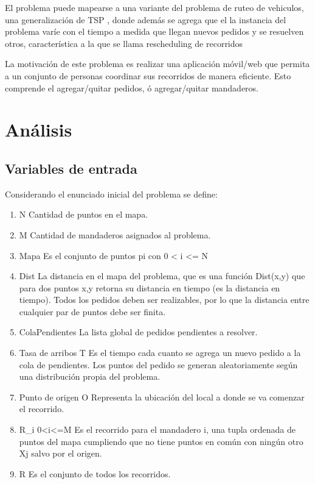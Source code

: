 \documentclass[9pt,conference]{IEEEtran}
\begin{document}
	El problema puede mapearse a una variante del problema de ruteo de vehiculos, una generalización de TSP \cite{refvrp}, donde además se agrega que el la instancia del problema varíe con el tiempo a medida que llegan nuevos pedidos y se resuelven otros, característica a la que se llama rescheduling de recorridos

	La motivación de este problema es realizar una aplicación móvil/web que permita a un conjunto de personas coordinar sus recorridos de manera eficiente. Esto comprende el agregar/quitar pedidos, ó agregar/quitar mandaderos.

	\section{Análisis}

	\subsection{Variables de entrada}

	Considerando el enunciado inicial del problema se define:

	\begin{enumerate}
		\item N
		Cantidad de puntos en el mapa.
		
		\item M
		Cantidad de mandaderos asignados al problema.
		
		\item Mapa
		Es el conjunto de puntos pi con 0 < i <= N
		
		\item Dist
		La distancia en el mapa del problema, que es una función Dist(x,y) que para dos puntos x,y retorna su distancia en tiempo (es la distancia en tiempo). Todos los pedidos deben ser realizables, por lo que la distancia entre cualquier par de puntos debe ser finita.
		
		\item ColaPendientes
		La lista global de pedidos pendientes a resolver.

		\item Tasa de arribos T
		Es el tiempo cada cuanto se agrega un nuevo pedido a la cola de pendientes. Los puntos del pedido se generan aleatoriamente según una distribución propia del problema.

		\item Punto de origen O
		Representa la ubicación del local a donde se va comenzar el recorrido.
		
		\item R_i 0<i<=M
		Es el recorrido para el mandadero i, una tupla ordenada de puntos del mapa cumpliendo que no tiene puntos en común con ningún otro Xj salvo por el origen.

		\item R
		Es el conjunto de todos los recorridos.

	\end{enumerate}
\end{document}
